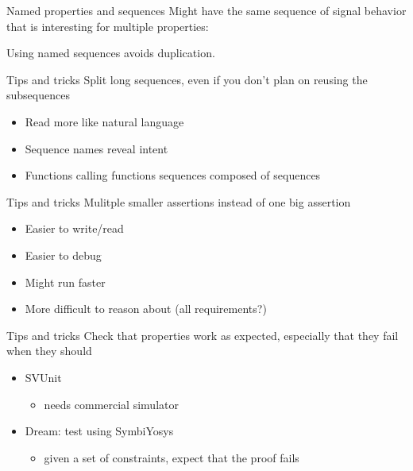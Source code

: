 \documentclass{beamer}
\begin{document}
\begin{frame}[fragile]{Named properties and sequences}
Might have the same sequence of signal behavior that is interesting for multiple properties:


Using named sequences avoids duplication.
\end{frame}


\begin{frame}{Tips and tricks}
Split long sequences, even if you don't plan on reusing the subsequences

\begin{itemize}
 \item Read more like natural language
 \item Sequence names reveal intent
 \item Functions calling functions \textrightarrow{} sequences composed of sequences
\end{itemize}
\end{frame}


\begin{frame}{Tips and tricks}
Mulitple smaller assertions instead of one big assertion

\begin{itemize}
 \item Easier to write/read
 \item Easier to debug
 \item Might run faster
 \item More difficult to reason about (all requirements?)
\end{itemize}
\end{frame}


\begin{frame}{Tips and tricks}
Check that properties work as expected, especially that they fail when they should

\begin{itemize}
 \item SVUnit
  \begin{itemize}
   \item needs commercial simulator
  \end{itemize}
 \item Dream: test using SymbiYosys
  \begin{itemize}
   \item given a set of constraints, expect that the proof fails
  \end{itemize}
\end{itemize}
\end{frame}
\end{document}
